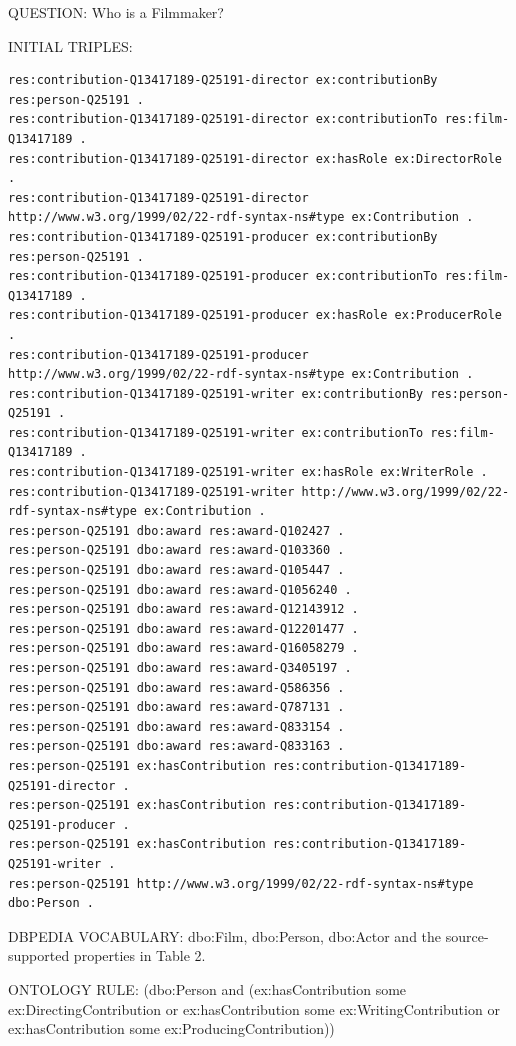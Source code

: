 \documentclass[
  11pt,
]{article}
\begin{document}
QUESTION: Who is a Filmmaker?

INITIAL TRIPLES:

\begin{verbatim}
res:contribution-Q13417189-Q25191-director ex:contributionBy res:person-Q25191 .
res:contribution-Q13417189-Q25191-director ex:contributionTo res:film-Q13417189 .
res:contribution-Q13417189-Q25191-director ex:hasRole ex:DirectorRole .
res:contribution-Q13417189-Q25191-director http://www.w3.org/1999/02/22-rdf-syntax-ns#type ex:Contribution .
res:contribution-Q13417189-Q25191-producer ex:contributionBy res:person-Q25191 .
res:contribution-Q13417189-Q25191-producer ex:contributionTo res:film-Q13417189 .
res:contribution-Q13417189-Q25191-producer ex:hasRole ex:ProducerRole .
res:contribution-Q13417189-Q25191-producer http://www.w3.org/1999/02/22-rdf-syntax-ns#type ex:Contribution .
res:contribution-Q13417189-Q25191-writer ex:contributionBy res:person-Q25191 .
res:contribution-Q13417189-Q25191-writer ex:contributionTo res:film-Q13417189 .
res:contribution-Q13417189-Q25191-writer ex:hasRole ex:WriterRole .
res:contribution-Q13417189-Q25191-writer http://www.w3.org/1999/02/22-rdf-syntax-ns#type ex:Contribution .
res:person-Q25191 dbo:award res:award-Q102427 .
res:person-Q25191 dbo:award res:award-Q103360 .
res:person-Q25191 dbo:award res:award-Q105447 .
res:person-Q25191 dbo:award res:award-Q1056240 .
res:person-Q25191 dbo:award res:award-Q12143912 .
res:person-Q25191 dbo:award res:award-Q12201477 .
res:person-Q25191 dbo:award res:award-Q16058279 .
res:person-Q25191 dbo:award res:award-Q3405197 .
res:person-Q25191 dbo:award res:award-Q586356 .
res:person-Q25191 dbo:award res:award-Q787131 .
res:person-Q25191 dbo:award res:award-Q833154 .
res:person-Q25191 dbo:award res:award-Q833163 .
res:person-Q25191 ex:hasContribution res:contribution-Q13417189-Q25191-director .
res:person-Q25191 ex:hasContribution res:contribution-Q13417189-Q25191-producer .
res:person-Q25191 ex:hasContribution res:contribution-Q13417189-Q25191-writer .
res:person-Q25191 http://www.w3.org/1999/02/22-rdf-syntax-ns#type dbo:Person .
\end{verbatim}

DBPEDIA VOCABULARY: dbo:Film, dbo:Person, dbo:Actor and the
source-\allowbreak{}s\allowbreak{}upported\allowbreak{} properties in
Table 2.

ONTOLOGY RULE: (dbo:Person and
(ex:\allowbreak{}has\allowbreak{}C\allowbreak{}ontribut\allowbreak{}ion
some
ex:\allowbreak{}\allowbreak{}Direc\allowbreak{}ting\allowbreak{}Cont\allowbreak{}ribution\allowbreak{}
or
ex:\allowbreak{}has\allowbreak{}Co\allowbreak{}ntributi\allowbreak{}on
some
ex:\allowbreak{}\allowbreak{}Writi\allowbreak{}ng\allowbreak{}Contri\allowbreak{}bution
or
ex:\allowbreak{}has\allowbreak{}Co\allowbreak{}ntributi\allowbreak{}on
some
ex:\allowbreak{}\allowbreak{}Produ\allowbreak{}cing\allowbreak{}Cont\allowbreak{}ribution\allowbreak{}))
\end{document}
